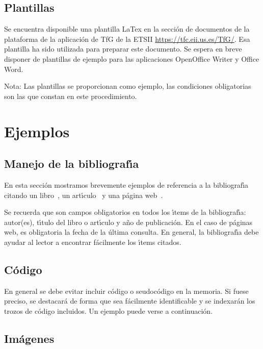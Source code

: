\FloatBarrier
\section{Plantillas}\label{sec:plantillas} 

Se encuentra disponible una plantilla LaTex en la secci\'on de documentos de la plataforma
de la aplicaci\'on de TfG de la ETSII 
\url{https://tfc.eii.us.es/TfG/}. Esa plantilla ha sido utilizada para preparar este documento.
Se espera en breve disponer de plantillas de ejemplo para las aplicaciones OpenOffice Writer y Office Word.

Nota: Las plantillas se proporcionan como ejemplo, las condiciones obligatorias son las que constan en este procedimiento.

\chapter{Ejemplos}\label{cap2} 
					
\FloatBarrier
\section{Manejo de la bibliograf{\'\i}a}
En esta secci\'on mostramos brevemente ejemplos de referencia a la bibliograf{\'\i}a 
citando un libro~\cite{desousa}, un art{\'\i}culo~\cite{guiatitlesec} 
y una p\'agina web~\cite{informatica}. 

Se recuerda que son campos obligatorios
en todos los {\'\i}tems de la bibliograf{\'\i}a: 
autor(es), t{\'\i}tulo del libro o art{\'\i}culo 
y a{\~n}o de publicaci\'on.
En el caso de p\'aginas web, 
es obligatoria la fecha de la \'ultima consulta. 
En general, la bibliograf{\'\i}a debe ayudar al lector a encontrar f\'acilmente los {\'\i}tems citados.

\FloatBarrier
\section{C\'odigo}

En general se debe evitar incluir c\'odigo o seudoc\'odigo en la memoria. Si fuese preciso, se destacar\'a de forma
que sea f\'acilmente identificable y se indexar\'an los trozos de c\'odigo incluidos. Un ejemplo puede verse
a continuaci\'on.


\FloatBarrier
\section{Im\'agenes}

